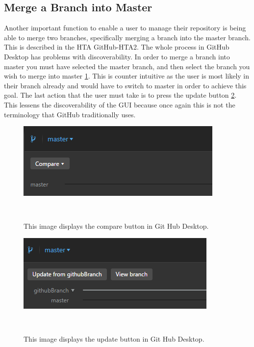 \documentclass{sigchi}
\begin{document}
\subsection{Merge a Branch into Master}
Another important function to enable a user to manage their repository is being able to merge two 
branches, specifically merging a branch into the master branch. This is described in the HTA 
GitHub-HTA2. The whole process in GitHub Desktop has problems with discoverability. In order 
to merge a branch into master you must have selected the master branch, and then select the branch 
you wish to merge into master \ref{fig:GitHub5}. This is counter intuitive as the user is most likely in their branch 
already and would have to switch to master in order to achieve this goal. The last action that the user
must take is to press the update button \ref{fig:GitHub6}. This lessens the discoverability of the GUI because once again
this is not the terminology that GitHub traditionally uses.

\begin{figure}
  \centering
  \includegraphics[width=1.75\columnwidth]{figures/GitHub/Git-Hub-Compare-Button.PNG}
  \caption{This image displays the compare button in Git Hub Desktop.}~\label{fig:GitHub5}
\end{figure}

\begin{figure}
  \centering
  \includegraphics[width=1.75\columnwidth]{figures/GitHub/Git-Hub-Changes-Update.PNG}
  \caption{This image displays the update button in Git Hub Desktop.}~\label{fig:GitHub6}
\end{figure}
\end{document}

